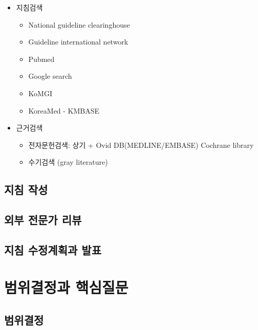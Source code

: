 \documentclass[]{book}
\providecommand{\tightlist}{%
  \setlength{\itemsep}{0pt}\setlength{\parskip}{0pt}}
\begin{document}
\begin{itemize}
\item
  지침검색

  \begin{itemize}
  \tightlist
  \item
    National guideline clearinghouse
  \item
    Guideline international network
  \item
    Pubmed
  \item
    Google search
  \item
    KoMGI
  \item
    KoreaMed - KMBASE
  \end{itemize}
\item
  근거검색

  \begin{itemize}
  \tightlist
  \item
    전자문헌검색: 상기 + Ovid DB(MEDLINE/EMBASE) Cochrane library
  \item
    수기검색 (gray literature)
  \end{itemize}
\end{itemize}

\hypertarget{section-44}{%
\section*{지침 작성}\label{section-44}}

\hypertarget{section-45}{%
\section*{외부 전문가 리뷰}\label{section-45}}

\hypertarget{section-46}{%
\section*{지침 수정계획과 발표}\label{section-46}}

\hypertarget{section-47}{%
\chapter{범위결정과 핵심질문}\label{section-47}}

\hypertarget{section-48}{%
\section*{범위결정}\label{section-48}}
\end{document}
